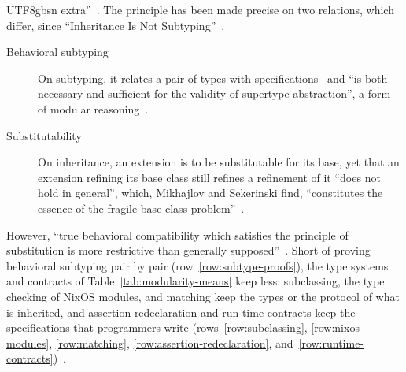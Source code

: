 \begin{CJK*}{UTF8}{gbsn}
extra''~\cite{liskov1987-data-abstraction-hierarchy}.
The principle has been made precise on two relations, which differ, since ``Inheritance Is Not
Subtyping''~\cite{cook1990-inheritance-not-subtyping}.
\begin{description}
  \item[Behavioral subtyping] On subtyping, it relates a pair of types with
    specifications~\cite{liskov1994-behavioral-subtyping} and ``is both necessary and sufficient for the
    validity of supertype abstraction'', a form of modular
    reasoning~\cite{leavens2015-behavioral-subtyping-modular-reasoning}.
  \item[Substitutability] On inheritance, an extension is to be substitutable for its base, yet that an
    extension refining its base class still refines a refinement of it ``does not hold in general'',
    which, Mikhajlov and Sekerinski find, ``constitutes the essence of the fragile base class
    problem''~\cite{mikhajlov1998-fragile-base-class}.
\end{description}
However, ``true behavioral compatibility which satisfies the principle of substitution is more
restrictive than generally supposed''~\cite[\S~4]{wegner1988-inheritance-incremental-modification}.
Short of proving behavioral subtyping pair by pair (row~\ref{row:subtype-proofs}), the type systems and
contracts of Table~\ref{tab:modularity-means} keep less: subclassing, the
type checking of NixOS modules, and matching keep the types or the protocol of what is inherited, and
assertion redeclaration and run-time contracts keep the specifications that programmers write
(rows~\ref{row:subclassing}, \ref{row:nixos-modules}, \ref{row:matching},
\ref{row:assertion-redeclaration}, and~\ref{row:runtime-contracts})~\cite{gosling2015-java-se8-specification,
nixos-contributors-nixos-modules, abadi1996-subtyping-and-matching,
meyer1997-object-oriented-software-construction, findler2001-behavioral-contracts}.
\fi



\end{CJK*}
